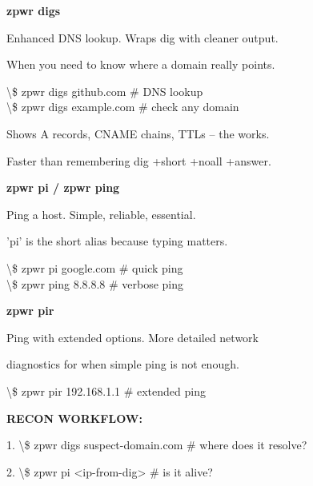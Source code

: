 \documentclass[11pt,a4paper,twoside]{book}
\begin{document}
\vspace{12pt}
{\bfseries\color{neonyellow} zpwr digs}\vspace{4pt}

Enhanced DNS lookup. Wraps dig with cleaner output.

When you need to know where a domain really points.

\begin{codebox}
\textbackslash{}\$ zpwr digs github.com         \# DNS lookup\\
\textbackslash{}\$ zpwr digs example.com        \# check any domain\\
\end{codebox}

Shows A records, CNAME chains, TTLs -- the works.

Faster than remembering dig +short +noall +answer.


\vspace{12pt}
{\bfseries\color{neonyellow} zpwr pi / zpwr ping}\vspace{4pt}

Ping a host. Simple, reliable, essential.

'pi' is the short alias because typing matters.

\begin{codebox}
\textbackslash{}\$ zpwr pi google.com           \# quick ping\\
\textbackslash{}\$ zpwr ping 8.8.8.8           \# verbose ping\\
\end{codebox}


\vspace{12pt}
{\bfseries\color{neonyellow} zpwr pir}\vspace{4pt}

Ping with extended options. More detailed network

diagnostics for when simple ping is not enough.

\begin{codebox}
\textbackslash{}\$ zpwr pir 192.168.1.1        \# extended ping\\
\end{codebox}


\vspace{12pt}
{\bfseries\color{neonyellow} RECON WORKFLOW:}\vspace{4pt}

1. \textbackslash{}\$ zpwr digs suspect-domain.com  \# where does it resolve?

2. \textbackslash{}\$ zpwr pi <ip-from-dig>         \# is it alive?
\end{document}
